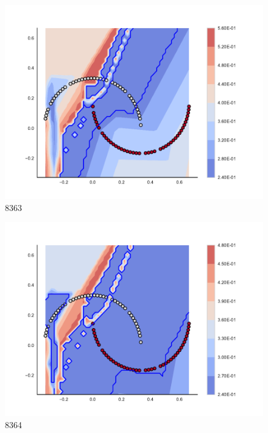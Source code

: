 \begin{subfigure}[b]{0.09\textwidth}
    \includegraphics[clip, trim=2.35cm 1.75cm 4.5cm 0cm,width=\textwidth]{img/convergence/8363.pdf}
    \caption{8363}
    \label{fig:convergence_8363}
\end{subfigure}
%
\begin{subfigure}[b]{0.09\textwidth}
    \includegraphics[clip, trim=2.35cm 1.75cm 4.5cm 0cm,width=\textwidth]{img/convergence/8364.pdf}
    \caption{8364}
    \label{fig:convergence_8364}
\end{subfigure}
%
